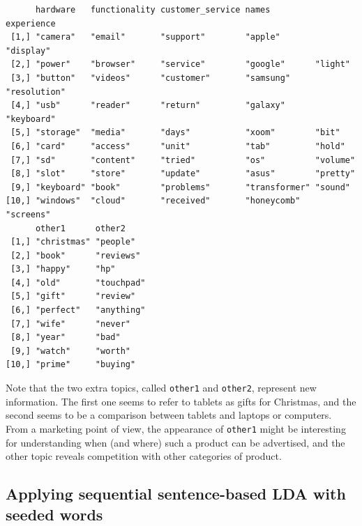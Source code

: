 \begin{Shaded}
\begin{Highlighting}[]
\NormalTok{(}\NormalTok{)}
\OtherTok{\textless{}{-}}  \NormalTok{, } \NormalTok{)}
\end{Highlighting}
\end{Shaded}

\begin{verbatim}
      hardware   functionality customer_service names         experience  
 [1,] "camera"   "email"       "support"        "apple"       "display"   
 [2,] "power"    "browser"     "service"        "google"      "light"     
 [3,] "button"   "videos"      "customer"       "samsung"     "resolution"
 [4,] "usb"      "reader"      "return"         "galaxy"      "keyboard"  
 [5,] "storage"  "media"       "days"           "xoom"        "bit"       
 [6,] "card"     "access"      "unit"           "tab"         "hold"      
 [7,] "sd"       "content"     "tried"          "os"          "volume"    
 [8,] "slot"     "store"       "update"         "asus"        "pretty"    
 [9,] "keyboard" "book"        "problems"       "transformer" "sound"     
[10,] "windows"  "cloud"       "received"       "honeycomb"   "screens"   
      other1      other2    
 [1,] "christmas" "people"  
 [2,] "book"      "reviews" 
 [3,] "happy"     "hp"      
 [4,] "old"       "touchpad"
 [5,] "gift"      "review"  
 [6,] "perfect"   "anything"
 [7,] "wife"      "never"   
 [8,] "year"      "bad"     
 [9,] "watch"     "worth"   
[10,] "prime"     "buying"  
\end{verbatim}

Note that the two extra topics, called \texttt{other1} and
\texttt{other2}, represent new information. The first one seems to refer to tablets as gifts for Christmas, and the second seems
to be a comparison between tablets and laptops or computers. From a marketing point of
view, the appearance of \texttt{other1} might be interesting for
understanding when (and where) such a product can be advertised, and the
other topic reveals competition with other categories of product.

\subsection{Applying sequential sentence-based LDA with seeded
words}\label{apply-sequential-lda-sentence-based-with-seeded-words}

